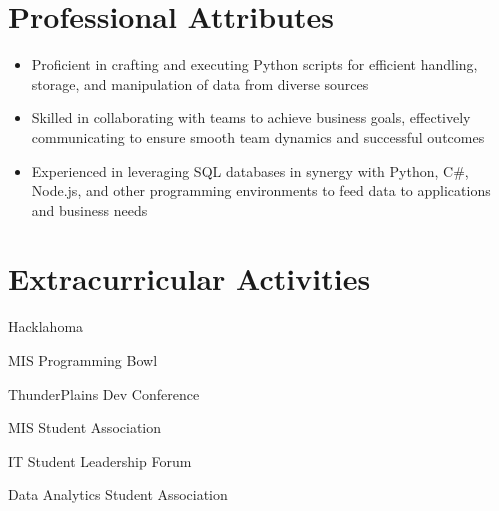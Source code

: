 \documentclass[letterpaper]{resumeconfig}
\begin{document}
\section{Professional Attributes}
\begin{itemize}[leftmargin=1.5em]
    \item Proficient in crafting and executing Python scripts for efficient handling, storage, and manipulation of data from diverse sources
    \vspace{-0.5em}
    \item Skilled in collaborating with teams to achieve business goals, effectively communicating to ensure smooth team dynamics and successful outcomes
    \vspace{-0.5em}
    \item Experienced in leveraging SQL databases in synergy with Python, C\#, Node.js, and other programming environments to feed data to applications and business needs
\end{itemize}

\section{Extracurricular Activities}

    \begin{ActivitiesList}
        \item Hacklahoma
        \item MIS Programming Bowl
        \item ThunderPlains Dev Conference
        \item MIS Student Association
        \item IT Student Leadership Forum
        \item Data Analytics Student Association
    \end{ActivitiesList}
\end{document}
